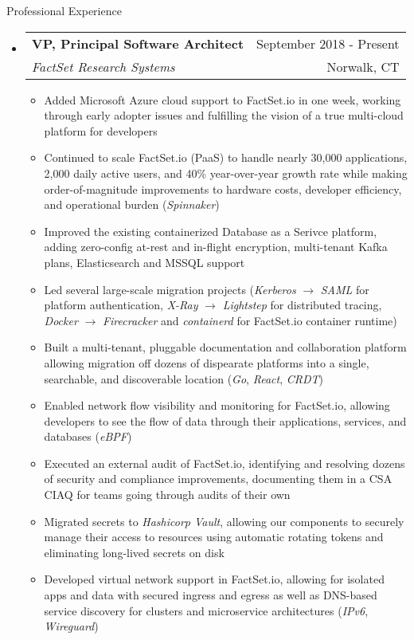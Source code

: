\documentclass[letterpaper,10pt]{article}
\makeatletter
\newenvironment{ressection}[1]{
	\vspace{4pt}
	{\fontfamily{phv}\selectfont\Large#1}
	\begin{itemize}
	\vspace{3pt}
}{
	\end{itemize}
}
\newcommand{\ressubitem}[1]{
	\vspace{-1pt}
	\item \begin{flushleft} #1 \end{flushleft}
}
\newcommand{\resbigitem}[4]{
	\vspace{-5pt}
	\item
	\begin{tabular*}{6in}{l@{\extracolsep{\fill}}r}
		\textbf{#1} & #2 \\
		\textit{#3} & #4\\
	\end{tabular*}
}
\newenvironment{ressubsec}[4]{
	\resbigitem{#1}{#2}{#3}{#4}
	\vspace{-2pt}
	\begin{itemize}
}{
	\end{itemize}
}
\makeatother
\begin{document}
\begin{ressection}{Professional Experience}
\begin{ressubsec}{VP, Principal Software Architect}{September 2018 - Present}{FactSet Research Systems}{Norwalk, CT}
		\ressubitem{Added Microsoft Azure cloud support to FactSet.io in one week, working through early adopter issues and fulfilling the vision of a true multi-cloud platform for developers}
		\ressubitem{Continued to scale FactSet.io (PaaS) to handle nearly 30,000 applications, 2,000 daily active users, and 40\% year-over-year growth rate while making order-of-magnitude improvements to hardware costs, developer efficiency, and operational burden (\textit{Spinnaker})}
		\ressubitem{Improved the existing containerized Database as a Serivce platform, adding zero-config at-rest and in-flight encryption, multi-tenant Kafka plans, Elasticsearch and MSSQL support}
		\ressubitem{Led several large-scale migration projects (\textit{Kerberos} $\rightarrow$ \textit{SAML} for platform authentication, \textit{X-Ray} $\rightarrow$ \textit{Lightstep} for distributed tracing, \textit{Docker} $\rightarrow$ \textit{Firecracker} and \textit{containerd} for FactSet.io container runtime)}
		\ressubitem{Built a multi-tenant, pluggable documentation and collaboration platform allowing migration off dozens of dispearate platforms into a single, searchable, and discoverable location (\textit{Go}, \textit{React}, \textit{CRDT})}
		\ressubitem{Enabled network flow visibility and monitoring for FactSet.io, allowing developers to see the flow of data through their applications, services, and databases (\textit{eBPF})}
		\ressubitem{Executed an external audit of FactSet.io, identifying and resolving dozens of security and compliance improvements, documenting them in a CSA CIAQ for teams going through audits of their own}
		\ressubitem{Migrated secrets to \textit{Hashicorp Vault}, allowing our components to securely manage their access to resources using automatic rotating tokens and eliminating long-lived secrets on disk}
		\ressubitem{Developed virtual network support in FactSet.io, allowing for isolated apps and data with secured ingress and egress as well as DNS-based service discovery for clusters and microservice architectures (\textit{IPv6}, \textit{Wireguard})}
	\end{ressubsec}

\pagebreak


\end{ressection}
\end{document}
